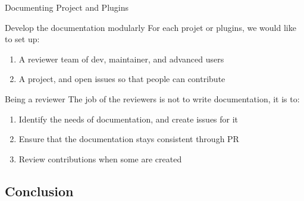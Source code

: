 \documentclass[10pt]{beamer}
\begin{document}
\begin{frame}{Documenting Project and Plugins}
  \begin{tcbProp}{Develop the documentation modularly}
    For each projet or plugins, we would like to set up:
    \begin{enumerate}
      \item<1-> A reviewer team of dev, maintainer, and advanced users
      \item<1-> A project, and open issues so that people can contribute
    \end{enumerate}
  \end{tcbProp}
  \begin{tcbProp}{Being a reviewer}
    The job of the reviewers is not to write documentation, it is to:
    \begin{enumerate}
      \item<3-> Identify the needs of documentation, and create issues for it
      \item<3-> Ensure that the documentation stays consistent through PR
      \item<3-> Review contributions when some are created
    \end{enumerate}
  \end{tcbProp}
\end{frame}

\subsection{Conclusion}
\end{document}
